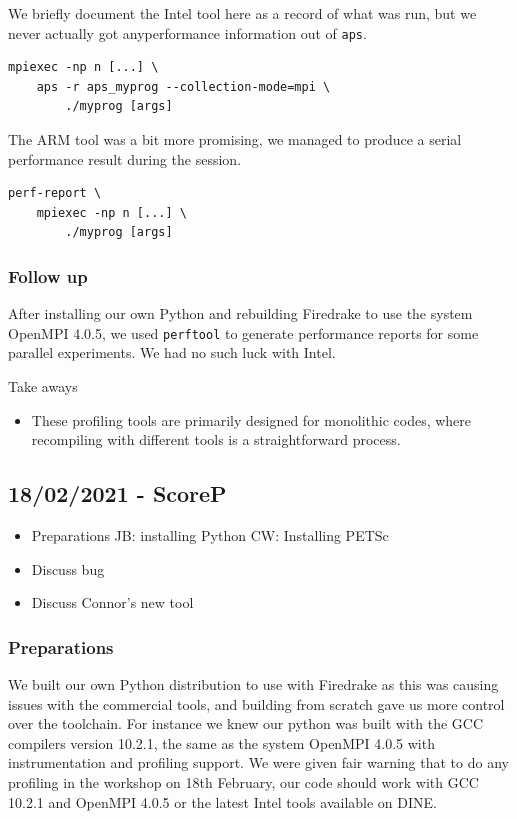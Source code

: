 \documentclass[a4paper,11pt]{article}
\newenvironment{jacknotes}{\color{red}\renewcommand{\labelitemi}{$\star$}\begin{itemize}}{\end{itemize}}
\begin{document}
We briefly document the Intel tool here as a record of what was run, but we never actually got anyperformance information out of \verb`aps`.
\begin{lstlisting}
mpiexec -np n [...] \
	aps -r aps_myprog --collection-mode=mpi \
		./myprog [args]
\end{lstlisting}

The ARM tool was a bit more promising, we managed to produce a serial performance result during the session.
\begin{lstlisting}
perf-report \
	mpiexec -np n [...] \
		./myprog [args]
\end{lstlisting}

\subsubsection*{Follow up}
After installing our own Python and rebuilding Firedrake to use the system OpenMPI 4.0.5, we used \verb`perftool` to generate performance reports for some parallel experiments.
We had no such luck with Intel.

Take aways
\begin{itemize}
	\item These profiling tools are primarily designed for monolithic codes, where recompiling with different tools is a straightforward process.
\end{itemize}

\clearpage
\subsection{18/02/2021 - ScoreP}
\label{ssec:scorep}
\begin{jacknotes}
	\item Preparations JB: installing Python CW: Installing PETSc
	\item Discuss bug
	\item Discuss Connor's new tool
\end{jacknotes}
\subsubsection*{Preparations}
We built our own Python distribution to use with Firedrake as this was causing issues with the commercial tools, and building from scratch gave us more control over the toolchain.
For instance we knew our python was built with the GCC compilers version 10.2.1, the same as the system OpenMPI 4.0.5 with instrumentation and profiling support.
We were given fair warning that to do any profiling in the workshop on 18th February, our code should work with GCC 10.2.1 and OpenMPI 4.0.5 or the latest Intel tools available on DINE.
\end{document}
